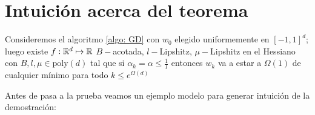 \section{Intuici\'on acerca del teorema}

\begin{theorem}
	Consideremos el algoritmo \ref{algo: GD} con $w_0$ elegido uniformemente en $[-1,1]^d$; luego existe $f : {\mathbb{R}}^d \mapsto {\mathbb{R}}$ $B-$acotada, $l-$Lipshitz, $\mu-$Lipshitz en el Hessiano con $B,l,\mu \in \text{poly}(d)$ tal que si $\alpha_k = \alpha \leq \frac{1}{l}$ entonces $w_k$ va a estar a $\Omega(1)$ de cualquier m\'inimo para todo $k \leq e^{\Omega(d)}$
\end{theorem}

Antes de pasa a la prueba veamos un ejemplo modelo para generar intuici\'on de la demostraci\'on:

